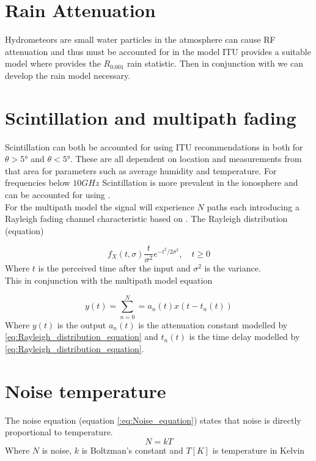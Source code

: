 \documentclass[conference]{IEEEtran}
\begin{document}
\label{sec:3}

\section{Rain Attenuation}
Hydrometeors are small water particles in the atmosphere can cause RF attenuation and thus must be accounted for in the model ITU provides a suitable model where \cite{ITU-R_P.837-1} provides the $R_{0.001}$ rain statistic. Then in conjunction with \cite{ITU-R_P.618-7} we can develop the rain model necessary.\\

\label{sec:4}


\section{Scintillation and multipath fading}
Scintillation can both be accounted for using ITU recommendations in \cite{ITU-R_P.618-7} both for $\theta> 5°$ and $\theta < 5°$. These are all dependent on location and measurements from that area for parameters such as average humidity and temperature. For frequencies below $10G Hz$ Scintillation is more prevalent in the ionosphere and can be accounted for using \cite{ITU-R_P.531-14}.\\

For the multipath model the signal will experience $N$ paths each introducing a Rayleigh fading channel characteristic  based on \cite{hou_simulation_2019}. The Rayleigh distribution (equation)

\begin{equation}
f_X(t, \sigma) \frac{t}{\sigma^2}e^{-t^2/2 \sigma^2}, \quad t\geq  0
\label{eq:Rayleigh_distribution_equation}
\end{equation}
Where $t$ is the perceived time after the input and $\sigma^2$ is the variance.\\

This in conjunction with the multipath model equation


\begin{equation}
y(t) = \sum_{n=0}^N = a_n(t) x(t-t_n(t))
\label{eq:Multipath_model}
\end{equation}
Where $y(t)$ is the output $a_n(t)$ is the attenuation constant modelled by \ref{eq:Rayleigh_distribution_equation} and $t_n(t)$ is the time delay modelled by \ref{eq:Rayleigh_distribution_equation}.
\label{sec:5}

\section{Noise temperature}
The noise equation (equation \ref{:eq:Noise_equation}) states that noise is directly proportional to temperature. 
\begin{equation}
N = kT
\label{:eq:Noise_equation}
\end{equation}
Where $N$ is noise, $k$ is Boltzman's constant and $T[K]$ is temperature in Kelvin\\
\end{document}
